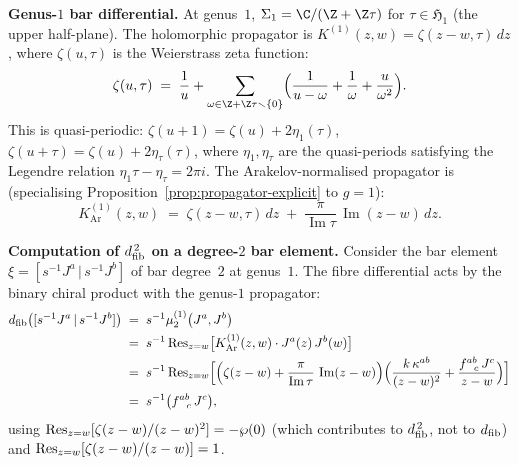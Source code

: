 \begin{example}
\smallskip\noindent
\textbf{Genus-$1$ bar differential.}
At genus~$1$, $\Sigma_1 = \C/(\Z + \Z\tau)$ for $\tau \in \mathfrak{H}_1$
(the upper half-plane). The holomorphic propagator is
$K^{(1)}(z,w) = \zeta(z-w,\tau)\,dz$, where $\zeta(u,\tau)$ is the
Weierstrass zeta function:
\begin{equation}\label{eq:weierstrass-zeta}
 \zeta(u,\tau)
 \;=\;
 \frac{1}{u} + \sum_{\omega \in \Z + \Z\tau \smallsetminus\{0\}}
 \Bigl(\frac{1}{u - \omega} + \frac{1}{\omega} +
 \frac{u}{\omega^2}\Bigr).
\end{equation}
This is quasi-periodic: $\zeta(u + 1) = \zeta(u) + 2\eta_1(\tau)$,
$\zeta(u + \tau) = \zeta(u) + 2\eta_\tau(\tau)$, where $\eta_1, \eta_\tau$
are the quasi-periods satisfying the Legendre relation
$\eta_1\tau - \eta_\tau = 2\pi i$. The Arakelov-normalised
propagator is (specialising
Proposition~\ref{prop:propagator-explicit} to $g = 1$):
\begin{equation}\label{eq:arakelov-genus-1}
 K^{(1)}_{\mathrm{Ar}}(z,w)
 \;=\;
 \zeta(z-w,\tau)\,dz
 \;+\;
 \frac{\pi}{\operatorname{Im}\tau}\,
 \operatorname{Im}(z-w)\, dz.
\end{equation}

\smallskip\noindent
\textbf{Computation of $d_{\mathrm{fib}}^{\,2}$ on a degree-$2$ bar element.}
Consider the bar element
$\xi = [s^{-1}J^a \,|\, s^{-1}J^b]$ of bar degree~$2$ at genus~$1$.
The fibre differential acts by the binary chiral product with the
genus-$1$ propagator:
\begin{align}\label{eq:dfib-affine-genus1}
 d_{\mathrm{fib}}\bigl([s^{-1}J^a \,|\, s^{-1}J^b]\bigr)
 &\;=\;
 s^{-1}\mu_2^{(1)}\bigl(J^a, J^b\bigr)
 \notag\\
 &\;=\;
 s^{-1}\operatorname{Res}_{z=w}\bigl[
 K^{(1)}_{\mathrm{Ar}}(z,w) \cdot
 J^a(z)\, J^b(w)
 \bigr]
 \notag\\
 &\;=\;
 s^{-1}\operatorname{Res}_{z=w}\Bigl[
 \Bigl(\zeta(z-w) + \frac{\pi}{\operatorname{Im}\tau}\,
 \operatorname{Im}(z-w)\Bigr)
 \Bigl(\frac{k\,\kappa^{ab}}{(z-w)^2}
 + \frac{f^{ab}_{\ \ c}\, J^c}{z-w}\Bigr)
 \Bigr]
 \notag\\
 &\;=\;
 s^{-1}\bigl(
 f^{ab}_{\ \ c}\, J^c
 \bigr),
\end{align}
using $\operatorname{Res}_{z=w}[\zeta(z-w)/(z-w)^2] = -\wp(0)$ (which contributes
to $d_{\mathrm{fib}}^{\,2}$, not to $d_{\mathrm{fib}}$) and
$\operatorname{Res}_{z=w}[\zeta(z-w)/(z-w)] = 1$.


\end{example}
